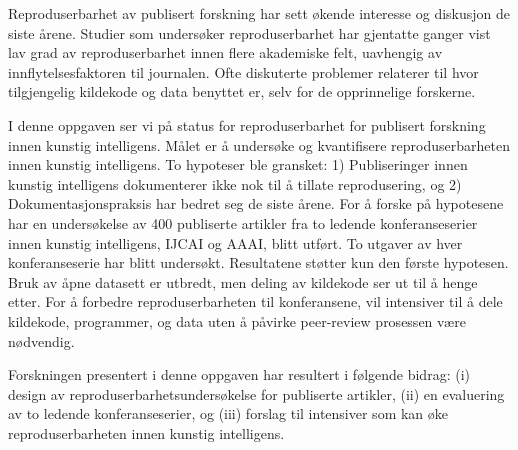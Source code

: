 \noindent Reproduserbarhet av publisert forskning har sett økende interesse og diskusjon de siste årene. Studier som undersøker reproduserbarhet har gjentatte ganger vist lav grad av reproduserbarhet innen flere akademiske felt, uavhengig av innflytelsesfaktoren til journalen. Ofte diskuterte problemer relaterer til hvor tilgjengelig kildekode og data benyttet er, selv for de opprinnelige forskerne.

I denne oppgaven ser vi på status for reproduserbarhet for publisert forskning innen kunstig intelligens. Målet er å undersøke og kvantifisere reproduserbarheten innen kunstig intelligens. To hypoteser ble gransket: 1) Publiseringer innen kunstig intelligens dokumenterer ikke nok til å tillate reprodusering, og 2) Dokumentasjonspraksis har bedret seg de siste årene. For å forske på hypotesene har en undersøkelse av 400 publiserte artikler fra to ledende konferanseserier innen kunstig intelligens, IJCAI og AAAI, blitt utført. To utgaver av hver konferanseserie har blitt undersøkt. Resultatene støtter kun den første hypotesen. Bruk av åpne datasett er utbredt, men deling av kildekode ser ut til å henge etter. For å forbedre reproduserbarheten til konferansene, vil intensiver til å dele kildekode, programmer, og data uten å påvirke peer-review prosessen være nødvendig.

Forskningen presentert i denne oppgaven har resultert i følgende bidrag: (i) design av reproduserbarhetsundersøkelse for publiserte artikler, (ii) en evaluering av to ledende konferanseserier, og (iii) forslag til intensiver som kan øke reproduserbarheten innen kunstig intelligens.

\cleardoublepage